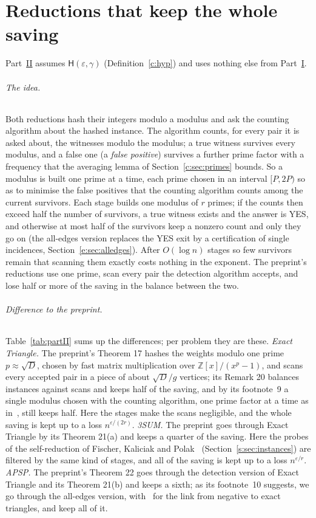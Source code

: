 \documentclass[11pt]{article}
\theoremstyle{definition}
\theoremstyle{remark}
\newcommand{\Z}{\mathbb{Z}}
\newcommand{\Hyp}{\mathsf{H}}
\begin{document}
\FloatBarrier
\part{Reductions that keep the whole saving}\label{m:partII}

Part~\hyperref[m:partII]{II} assumes $\Hyp(\varepsilon,\gamma)$ (Definition~\ref{c:hyp}) and uses nothing else from Part~\hyperref[m:partI]{I}.

\paragraph{The idea.} Both reductions hash their integers modulo a modulus and ask the counting algorithm about the hashed instance. The algorithm counts, for every pair it is asked about, the witnesses modulo the modulus; a true witness survives every modulus, and a false one (a \emph{false positive}) survives a further prime factor with a frequency that the averaging lemma of Section~\ref{c:sec:primes} bounds. So a modulus is built one prime at a time, each prime chosen in an interval $[P,2P)$ so as to minimise the false positives that the counting algorithm counts among the current survivors. Each stage builds one modulus of $r$ primes; if the counts then exceed half the number of survivors, a true witness exists and the answer is YES, and otherwise at most half of the survivors keep a nonzero count and only they go on (the all-edges version replaces the YES exit by a certification of single incidences, Section~\ref{e:sec:alledges}). After $O(\log n)$ stages so few survivors remain that scanning them exactly costs nothing in the exponent. The preprint's reductions use one prime, scan every pair the detection algorithm accepts, and lose half or more of the saving in the balance between the two.

\paragraph{Difference to the preprint.} Table~\ref{tab:partII} sums up the differences; per problem they are these. \emph{Exact Triangle.} The preprint's Theorem 17 hashes the weights modulo one prime $p\approx\sqrt D$, chosen by fast matrix multiplication over $\Z[x]/(x^p-1)$, and scans every accepted pair in a piece of about $\sqrt D/g$ vertices; its Remark 20 balances instances against scans and keeps half of the saving, and by its footnote~9 a single modulus chosen with the counting algorithm, one prime factor at a time as in~\cite[Lemma~3.2]{FKP24}, still keeps half. Here the stages make the scans negligible, and the whole saving is kept up to a loss $n^{\varepsilon/(2r)}$. \emph{3SUM.} The preprint goes through Exact Triangle by its Theorem 21(a) and keeps a quarter of the saving. Here the probes of the self-reduction of Fischer, Kaliciak and Polak~\cite{FKP24} (Section~\ref{s:sec:instances}) are filtered by the same kind of stages, and all of the saving is kept up to a loss $n^{\varepsilon/r}$. \emph{APSP.} The preprint's Theorem 22 goes through the detection version of Exact Triangle and its Theorem 21(b) and keeps a sixth; as its footnote~10 suggests, we go through the all-edges version, with~\cite[Lemma 9.2]{CVX23} for the link from negative to exact triangles, and keep all of it.
\end{document}
